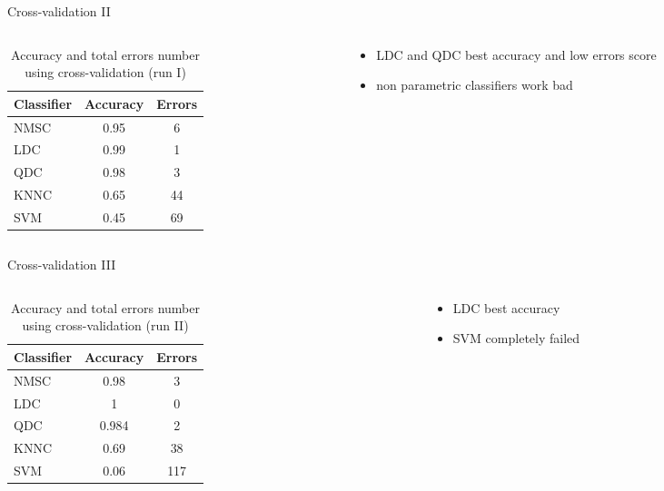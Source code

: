 \documentclass{beamer}
\begin{document}
\begin{frame}{Cross-validation II}
\begin{columns}[t]
\begin{column}{.5\textwidth}
\begin{table}
\begin{tabular}{l || c | c  }
Classifier & Accuracy & Errors \\
\hline \hline
NMSC & 0.95 & 6  \\ 
LDC & 0.99 & 1 \\
QDC & 0.98 & 3 \\
KNNC & 0.65 & 44 \\
SVM & 0.45 & 69
\end{tabular}
\caption{{\scriptsize Accuracy and total errors number using cross-validation (run I)}}
\end{table}

\end{column}
\begin{column}{.5\textwidth}
\begin{itemize}
  \item{
    LDC and QDC best accuracy and low errors score
    }
  \item{
    non parametric classifiers work bad
  }
  \end{itemize}
\end{column}
\end{columns}
\end{frame}

\begin{frame}{Cross-validation III}
\begin{columns}[t]
\begin{column}{.5\textwidth}
\begin{table}
\begin{tabular}{l || c | c  }
Classifier & Accuracy & Errors \\
\hline \hline
NMSC & 0.98 & 3  \\ 
LDC & 1 & 0 \\
QDC & 0.984 & 2 \\
KNNC & 0.69 & 38 \\
SVM & 0.06 & 117
\end{tabular}
\caption{{\scriptsize Accuracy and total errors number using cross-validation (run II)}}
\end{table}

\end{column}
\begin{column}{.5\textwidth}
\begin{itemize}
  \item{
    LDC best accuracy
    }
  \item{
    SVM completely failed
  }
  \end{itemize}
\end{column}
\end{columns}
\end{frame}
\end{document}

